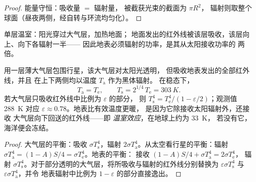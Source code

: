 \begin{proof}
能量守恒：吸收量 $= $ 辐射量，
被截获光束的截面为 $\pi R^2$，
辐射则取整个球面（昼夜两侧，经自转与环流均匀化）。
\end{proof}

\begin{omfigure}

{\small 单层温室：阳光穿过大气层，加热地面；
地面发出的红外线被该层吸收，该层向上、向下各辐射一半——
因此地表必须辐射的功率，是其从太阳接收功率的
两倍。}
\end{omfigure}

\begin{proposition}[单层温室模型]\label{prop:b2:thermal-radiation:greenhouse}
用一层薄大气层包围行星，该大气层对太阳光透明，
但吸收地表发出的全部红外线，并且
在上下两侧均以温度 $T_{\text{a}}$ 作为黑体辐射。
在稳态下，
\[
T_{\text{a}} = T_{\text{e}}, \qquad
T_{\text{s}} = 2^{1/4}\,T_{\text{e}} = \qty{303}{K} .
\]
若大气层只吸收红外线中比例为 $\varepsilon$ 的部分，
则 $T_{\text{s}}^4 = T_{\text{e}}^4/(1 - \varepsilon/2)$；观测值
\qty{288}{K} 对应 $\varepsilon \approx 0.78$。地表比有效温度更暖，
是因为它除接收太阳辐射外，还接收
大气层向下回送的红外线——即
\emph{温室效应}，在地球上约为 \qty{33}{K}，
若没有它，海洋便会冻结。
\end{proposition}

\begin{proof}
大气层的平衡：吸收 $\sigma T_{\text{s}}^4$，辐射 $2\sigma
T_{\text{a}}^4$。从太空看行星的平衡：辐射 $\sigma
T_{\text{a}}^4 = (1 - A)S/4 = \sigma T_{\text{e}}^4$。地表的平衡：
接收 $(1 - A)S/4 + \sigma T_{\text{a}}^4 = 2\sigma T_{\text{e}}^4$，
辐射 $\sigma T_{\text{s}}^4$。对于部分透明的大气层，将所吸收与辐射的红外线分别替换为
$\varepsilon\sigma T_{\text{s}}^4$ 与
$\varepsilon\sigma T_{\text{a}}^4$，并令
地表辐射中比例为 $1 - \varepsilon$ 的部分直接逸出。
\end{proof}

